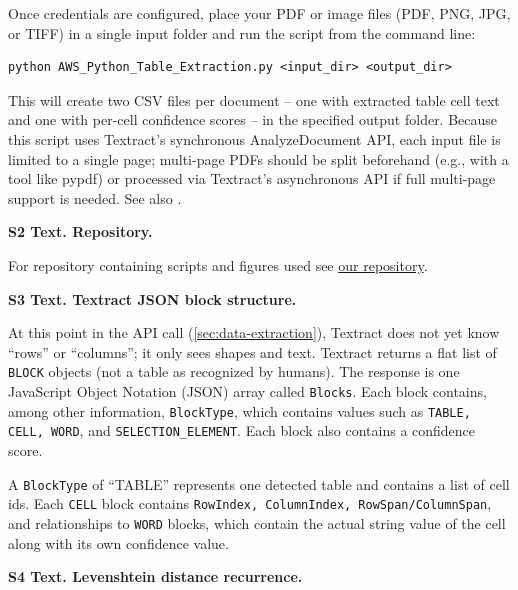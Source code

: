 \documentclass[12pt]{article}
\begin{document}
Once credentials are configured, place your PDF or image files (PDF, PNG, JPG, or TIFF) in a single input folder and run the script from the command line:

\begin{lstlisting}[basicstyle=\ttfamily\footnotesize]
python AWS_Python_Table_Extraction.py <input_dir> <output_dir>
\end{lstlisting}

\noindent This will create two CSV files per document -- one with extracted table cell text and one with per-cell confidence scores -- in the specified output folder. Because this script uses Textract's synchronous AnalyzeDocument API, each input file is limited to a single page; multi-page PDFs should be split beforehand (e.g., with a tool like pypdf) or processed via Textract's asynchronous API if full multi-page support is needed. See also \cite{aws_textract}.

\noindent\textbf{S2 Text. Repository.}

For repository containing scripts and figures used see \href{https://github.com/EdenNal/Textract_Results}{our repository}.

\bigskip
\noindent\textbf{S3 Text. Textract JSON block structure.}

At this point in the API call (\cref{sec:data-extraction}), Textract does not yet know ``rows'' or ``columns''; it only sees shapes and text. Textract returns a flat list of \texttt{BLOCK} objects (not a table as recognized by humans). The response is one JavaScript Object Notation (JSON) array called \texttt{Blocks}. Each block contains, among other information, \texttt{BlockType}, which contains values such as \texttt{TABLE, CELL, WORD}, and \texttt{SELECTION\_ELEMENT}. Each block also contains a confidence score.

A \texttt{BlockType} of ``TABLE'' represents one detected table and contains a list of cell ids. Each \texttt{CELL} block contains \texttt{RowIndex, ColumnIndex, RowSpan/ColumnSpan}, and relationships to \texttt{WORD} blocks, which contain the actual string value of the cell along with its own confidence value.

\bigskip
\noindent\textbf{S4 Text. Levenshtein distance recurrence.}
\end{document}
